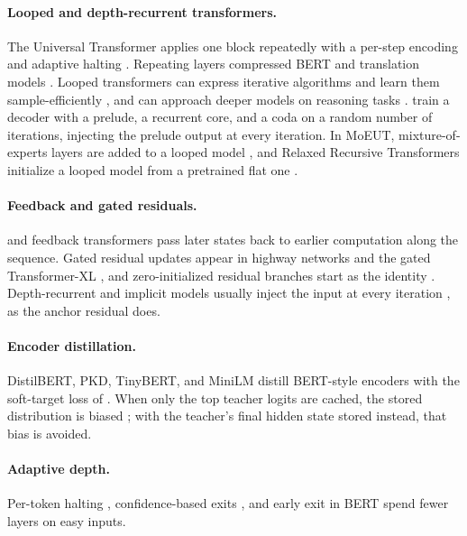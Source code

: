 \documentclass[11pt]{article}
\begin{document}
\paragraph{Looped and depth-recurrent transformers.}
The Universal Transformer applies one block repeatedly with a per-step encoding and adaptive halting \citep{dehghani2019universal}. Repeating
layers compressed BERT \citep{lan2020albert} and translation models \citep{dabre2019recurrent,takase2021lessons}. Looped transformers can express
iterative algorithms \citep{giannou2023looped} and learn them sample-efficiently \citep{yang2024looped}, and can approach deeper models on reasoning tasks
\citep{saunshi2025latent}. \citet{geiping2025recurrent} train a decoder with a prelude, a
recurrent core, and a coda on a random number of iterations, injecting the prelude output at every iteration. In MoEUT, mixture-of-experts
layers are added to a looped model \citep{csordas2024moeut}, and Relaxed Recursive Transformers initialize a looped model from a pretrained flat one
\citep{bae2025relaxed}.

\paragraph{Feedback and gated residuals.}
\citet{zhang2026rlt} and feedback transformers \citep{fan2020feedback} pass later states back to earlier computation along the sequence. Gated
residual updates appear in highway networks \citep{srivastava2015highway} and the gated Transformer-XL \citep{parisotto2020gtrxl}, and
zero-initialized residual branches start as the identity \citep{bachlechner2021rezero}. Depth-recurrent and implicit models usually inject the
input at every iteration \citep{bai2019deq,geiping2025recurrent,yang2024looped}, as the anchor residual does.

\paragraph{Encoder distillation.}
DistilBERT, PKD, TinyBERT, and MiniLM distill BERT-style encoders \citep{sanh2019distilbert,sun2019pkd,jiao2020tinybert,wang2020minilm} with the
soft-target loss of \citet{hinton2015distilling}. When only the top teacher logits are cached, the stored distribution is
biased \citep{anshumann2025sparse}; with the teacher's final hidden state stored instead, that bias is avoided.

\paragraph{Adaptive depth.}
Per-token halting \citep{graves2016act,banino2021pondernet,elbayad2020depthadaptive,bae2025mor}, confidence-based exits \citep{schuster2022calm},
and early exit in BERT \citep{xin2020deebert,zhou2020pabee} spend fewer layers on easy inputs.
\end{document}
